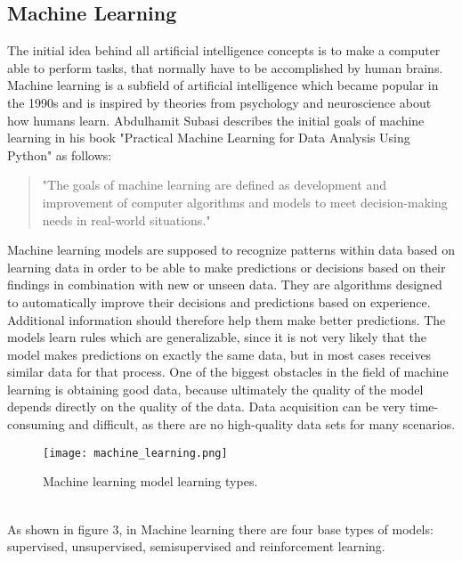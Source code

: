 \documentclass[../masterarbeit.tex]{subfiles}
\begin{document}
	














\subsection{Machine Learning}
The initial idea behind all artificial intelligence concepts is to make a computer able to perform tasks, that normally have to be accomplished by human brains. Machine learning is a subfield of artificial intelligence which became popular in the 1990s and is inspired by theories from psychology and neuroscience about how humans learn. \autocite[]{VIEIRA20201} \autocite[]{SUBASI202091}
Abdulhamit Subasi describes the initial goals of machine learning in his book "Practical Machine Learning for Data Analysis Using Python" as follows:
\begin{quote}
	"The goals of machine learning are defined as development and improvement of
computer algorithms and models to meet decision-making needs in real-world situations." \autocite{SUBASI202091}
\end{quote}
Machine learning models are supposed to recognize patterns within data based on learning data in order to be able to make predictions or decisions based on their findings in combination with new or unseen data. They are algorithms designed to automatically improve their decisions and predictions based on experience. Additional information should therefore help them make better predictions. The models learn rules which are generalizable, since it is not very likely that the model makes predictions on exactly the same data, but in most cases receives similar data for that process. \autocite[]{VIEIRA20201}
One of the biggest obstacles in the field of machine learning is obtaining good data, because ultimately the quality of the model depends directly on the quality of the data. Data acquisition can be very time-consuming and difficult, as there are no high-quality data sets for many scenarios. \autocite[]{SUBASI202091}
\begin{figure}[h]
    \centering
    \texttt{[image: machine\_learning.png]}
    \caption{Machine learning model learning types.}
\end{figure} \\
As shown in figure 3, in Machine learning there are four base types of models: supervised, unsupervised, semisupervised and reinforcement learning. \autocite[]{VIEIRA20201} \autocite[]{ibm-supervised-learning:2022} \autocite[]{PISNER2020101}
 \\~\\
 
\end{document}
